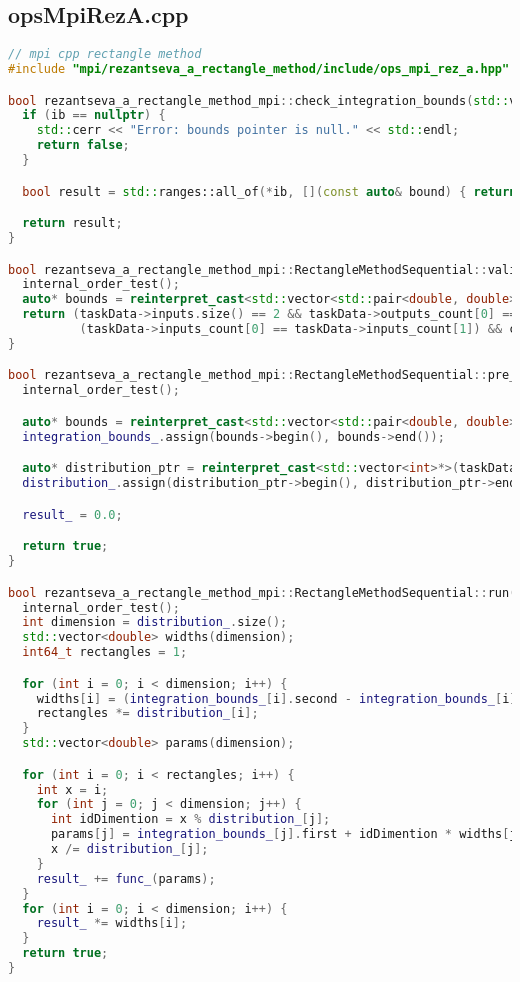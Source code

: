 \documentclass[12pt]{article}
\begin{document}
\subsection*{opsMpiRezA.cpp}
\begin{lstlisting}[language=C++]
// mpi cpp rectangle method
#include "mpi/rezantseva_a_rectangle_method/include/ops_mpi_rez_a.hpp"

bool rezantseva_a_rectangle_method_mpi::check_integration_bounds(std::vector<std::pair<double, double>>* ib) {
  if (ib == nullptr) {
    std::cerr << "Error: bounds pointer is null." << std::endl;
    return false;
  }

  bool result = std::ranges::all_of(*ib, [](const auto& bound) { return bound.first < bound.second; });

  return result;
}

bool rezantseva_a_rectangle_method_mpi::RectangleMethodSequential::validation() {
  internal_order_test();
  auto* bounds = reinterpret_cast<std::vector<std::pair<double, double>>*>(taskData->inputs[0]);
  return (taskData->inputs.size() == 2 && taskData->outputs_count[0] == 1 &&
          (taskData->inputs_count[0] == taskData->inputs_count[1]) && check_integration_bounds(bounds));
}

bool rezantseva_a_rectangle_method_mpi::RectangleMethodSequential::pre_processing() {
  internal_order_test();

  auto* bounds = reinterpret_cast<std::vector<std::pair<double, double>>*>(taskData->inputs[0]);
  integration_bounds_.assign(bounds->begin(), bounds->end());

  auto* distribution_ptr = reinterpret_cast<std::vector<int>*>(taskData->inputs[1]);
  distribution_.assign(distribution_ptr->begin(), distribution_ptr->end());

  result_ = 0.0;

  return true;
}

bool rezantseva_a_rectangle_method_mpi::RectangleMethodSequential::run() {
  internal_order_test();
  int dimension = distribution_.size();
  std::vector<double> widths(dimension);
  int64_t rectangles = 1;

  for (int i = 0; i < dimension; i++) {
    widths[i] = (integration_bounds_[i].second - integration_bounds_[i].first) / static_cast<double>(distribution_[i]);
    rectangles *= distribution_[i];
  }
  std::vector<double> params(dimension);

  for (int i = 0; i < rectangles; i++) {
    int x = i;
    for (int j = 0; j < dimension; j++) {
      int idDimention = x % distribution_[j];
      params[j] = integration_bounds_[j].first + idDimention * widths[j] + widths[j] / 2;
      x /= distribution_[j];
    }
    result_ += func_(params);
  }
  for (int i = 0; i < dimension; i++) {
    result_ *= widths[i];
  }
  return true;
}


\end{lstlisting}
\end{document}
